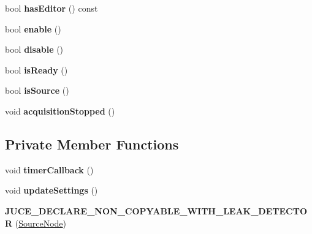 \begin{DoxyCompactItemize}
\item 
\hypertarget{classSourceNode_a9bad4ed9244b490448b712776ff78123}{bool {\bfseries has\-Editor} () const }\label{classSourceNode_a9bad4ed9244b490448b712776ff78123}

\item 
\hypertarget{classSourceNode_a34ef124baa3dd9d3d94f92a8ce40dd94}{bool {\bfseries enable} ()}\label{classSourceNode_a34ef124baa3dd9d3d94f92a8ce40dd94}

\item 
\hypertarget{classSourceNode_ab611b02d5535aa01cdebc0fea95f349e}{bool {\bfseries disable} ()}\label{classSourceNode_ab611b02d5535aa01cdebc0fea95f349e}

\item 
\hypertarget{classSourceNode_aac2b14b5eb996f44bb81ea0a097ec1d5}{bool {\bfseries is\-Ready} ()}\label{classSourceNode_aac2b14b5eb996f44bb81ea0a097ec1d5}

\item 
\hypertarget{classSourceNode_a08d7383fb2cae095356c45ed91d491ad}{bool {\bfseries is\-Source} ()}\label{classSourceNode_a08d7383fb2cae095356c45ed91d491ad}

\item 
\hypertarget{classSourceNode_ab86697fbc4618026ce0a51087f9537b9}{void {\bfseries acquisition\-Stopped} ()}\label{classSourceNode_ab86697fbc4618026ce0a51087f9537b9}

\end{DoxyCompactItemize}
\subsection*{Private Member Functions}
\begin{DoxyCompactItemize}
\item 
\hypertarget{classSourceNode_ac0529c95b1179f9a62d9d3d5b94e4a54}{void {\bfseries timer\-Callback} ()}\label{classSourceNode_ac0529c95b1179f9a62d9d3d5b94e4a54}

\item 
\hypertarget{classSourceNode_acda032e8fe961d76456ea81913892627}{void {\bfseries update\-Settings} ()}\label{classSourceNode_acda032e8fe961d76456ea81913892627}

\item 
\hypertarget{classSourceNode_a363a1e41e163aa2373f81a006be110bf}{{\bfseries J\-U\-C\-E\-\_\-\-D\-E\-C\-L\-A\-R\-E\-\_\-\-N\-O\-N\-\_\-\-C\-O\-P\-Y\-A\-B\-L\-E\-\_\-\-W\-I\-T\-H\-\_\-\-L\-E\-A\-K\-\_\-\-D\-E\-T\-E\-C\-T\-O\-R} (\hyperlink{classSourceNode}{Source\-Node})}\label{classSourceNode_a363a1e41e163aa2373f81a006be110bf}

\end{DoxyCompactItemize}
